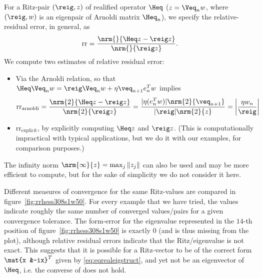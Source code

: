  For a Ritz-pair $(\reig,z)$ of realified operator $\Heq$
($z=\Veq_n w$, where $(\reig,w)$ is an eigenpair of Arnoldi matrix $\Heq_n$),
we specify the relative-residual error, in general, as
\begin{equation*}
      \mathrm{rr} = \frac{\nrm{}{\Heq z-\reig z}}{\nrm{}{\reig z}}.
\end{equation*}
We compute two estimates of relative residual error:
\begin{itemize}
\item Via the Arnoldi relation, so that
$\Heq \Veq_n w = \reig \Veq_n w + \eta \veq_{n+1} e_n^{T} w$
implies
	 \begin{equation*}
	      \mathrm{rr_{arnoldi}} =  \frac{\nrm{2}{\Heq z-\reig z}}{\nrm{2}{\reig z}}
	      = \frac{\vert \eta(e_n^{T} w)\vert \nrm{2}{\veq_{n+1}}}{\vert \reig\vert\nrm{2}{z}}
	      = \left\vert\frac{\eta w_{n}}{\reig}\right\vert
      \end{equation*}

\item $\mathrm{rr_{explicit}}$, by explicitly computing $\Heq z$ and $\reig z$.  (This is
computationally impractical with typical applications, but we do it with our examples, for
comparison purposes.)
\end{itemize}
	
The infinity norm $\nrm{\infty}{z}=\max_j\|z_j \|$ can also be used and may be more efficient
to compute, but for the sake of simplicity we do not consider it here.

Different measures of convergence for the same Ritz-values are compared in
figure~\ref{fig:rrhess308s1w50}.
For every example that we have tried, the values indicate
roughly the same number of converged values/pairs for a given convergence tolerance.
The form-error for the eigenvalue represented in the $14$-th position
of figure~\ref{fig:rrhess308s1w50} is exactly $0$ (and is thus missing from the plot),
although relative residual errors indicate
that the Ritz/eigenvalue is not exact.  This suggests that it is possible for a Ritz-vector
to be of the correct form $\mat{x &-ix}^T$ given by \eqref{eq:eqrealeigstruct}, and yet
not be an eigenvector of $\Heq$,  i.e. the converse of \cite[Proposition 5.1]{AN}
does not hold.
	
